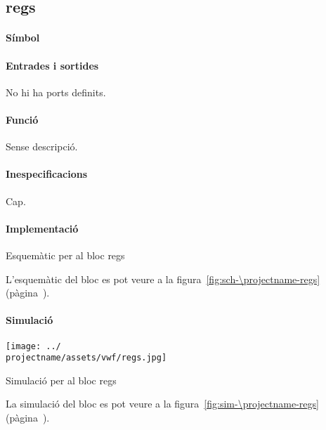 \subsection{\label{sub:\projectname-regs} \textsf{regs}}

\paragraph{Símbol}

\begin{center}  \end{center}

\paragraph{Entrades i sortides}

No hi ha ports definits.

\paragraph{Funció}

Sense descripció.

\paragraph{Inespecificacions}

Cap.

\paragraph{Implementació}

\begin{contendfig}
  \begin{center}
  \end{center}
  \caption{\label{fig:sch-\projectname-regs} Esquemàtic per al bloc \textsf{regs}}
\end{contendfig}

L'esquemàtic del bloc es pot veure a la figura~\ref{fig:sch-\projectname-regs} (pàgina~\pageref{fig:sch-\projectname-regs}).


\paragraph{Simulació}

\begin{contendfig}
  \begin{center}
    \texttt{[image: ../\\projectname/assets/vwf/regs.jpg]}
  \end{center}
  \caption{\label{fig:sim-\projectname-regs} Simulació per al bloc \textsf{regs}}
\end{contendfig}

La simulació del bloc es pot veure a la figura~\ref{fig:sim-\projectname-regs} (pàgina~\pageref{fig:sim-\projectname-regs}).


\vspace{1cm}
